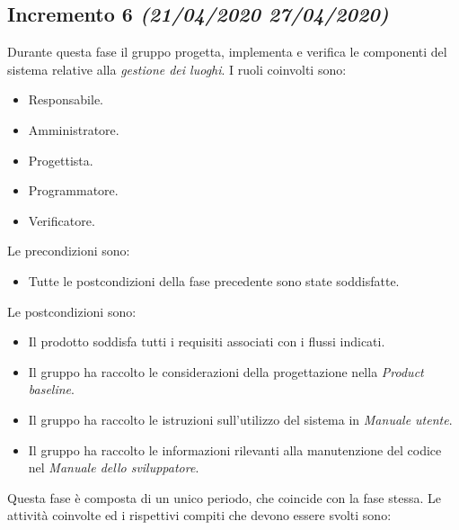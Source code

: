 \documentclass[../piano-di-progetto.tex]{subfiles}
\begin{document}
\subsection[Incremento 6]{Incremento 6 {\normalsize\normalfont\itshape(21/04/2020  27/04/2020)}}%
\label{sub:incremento_6}
Durante questa fase il gruppo progetta, implementa e verifica le componenti del sistema relative alla \textit{gestione dei luoghi}.
I ruoli coinvolti sono:
\begin{itemize}
  \item Responsabile.
  \item Amministratore.
  \item Progettista.
  \item Programmatore.
  \item Verificatore.
\end{itemize}
Le precondizioni sono:
\begin{itemize}
  \item Tutte le postcondizioni della fase precedente sono state soddisfatte.
\end{itemize}
Le postcondizioni sono:
\begin{itemize}
  \item Il prodotto soddisfa tutti i requisiti associati con i flussi indicati.
  \item Il gruppo ha raccolto le considerazioni della progettazione nella \textit{Product baseline}.
  \item Il gruppo ha raccolto le istruzioni sull'utilizzo del sistema in \textit{Manuale utente}.
  \item Il gruppo ha raccolto le informazioni rilevanti alla manutenzione del codice nel \textit{Manuale dello sviluppatore}.
\end{itemize}
Questa fase è composta di un unico periodo, che coincide con la fase stessa.
Le attività coinvolte ed i rispettivi compiti che devono essere svolti sono:
\end{document}
